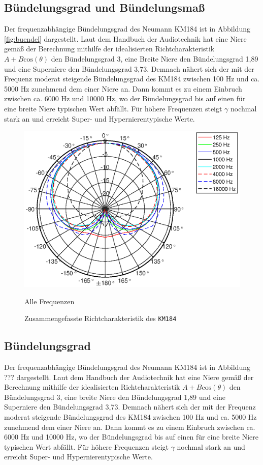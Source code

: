 \subsection{Bündelungsgrad und Bündelungsmaß}
\label{subsec:e}
Der frequenzabhängige Bündelungsgrad des Neumann KM184 ist in Abbildung \ref{fig:buendel} dargestellt. 
Laut dem Handbuch der Audiotechnik \cite{Weinzierl08} hat eine Niere gemäß der Berechnung mithilfe der idealisierten Richtcharakteristik $A + B \mathrm{cos}(\theta)$ den Bündelungsgrad 3, eine Breite Niere den Bündelungsgrad 1,89 und eine Superniere den Bündelungsgrad 3,73.
Demnach nähert sich der mit der Frequenz moderat steigende Bündelungsgrad des KM184 zwischen 100 Hz und ca. 5000 Hz zunehmend dem einer Niere an.
Dann kommt es zu einem Einbruch zwischen ca. 6000 Hz und 10000 Hz, wo der Bündelungsgrad bis auf einen für eine breite Niere typischen Wert abfällt. 
Für höhere Frequenzen steigt $\gamma$ nochmal stark an und erreicht  Super- und Hypernierentypische Werte.

\begin{figure}[bth]
    \centering
    \includegraphics[width=\linewidth]{Figures/KM184_allfreqs}
    \caption{Alle Frequenzen}
    \label{fig:Polar_allfreqs}
    \caption{Zusammengefasste Richtcharakteristik des \texttt{KM184}}
\end{figure}

\subsection{Bündelungsgrad}
Der frequenzabhängige Bündelungsgrad des Neumann KM184 ist in Abbildung ??? dargestellt. 
Laut dem Handbuch der Audiotechnik \cite{Weinzierl08} hat eine Niere gemäß der Berechnung mithilfe der idealisierten Richtcharakteristik $A + B \mathrm{cos}(\theta)$ den Bündelungsgrad 3, eine breite Niere den Bündelungsgrad 1,89 und eine Superniere den Bündelungsgrad 3,73.
Demnach nähert sich der mit der Frequenz moderat steigende Bündelungsgrad des KM184 zwischen 100 Hz und ca. 5000 Hz zunehmend dem einer Niere an.
Dann kommt es zu einem Einbruch zwischen ca. 6000 Hz und 10000 Hz, wo der Bündelungsgrad bis auf einen für eine breite Niere typischen Wert abfällt. 
Für höhere Frequenzen steigt $\gamma$ nochmal stark an und erreicht  Super- und Hypernierentypische Werte.

